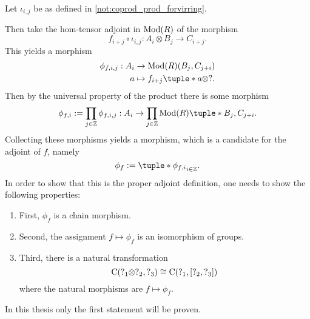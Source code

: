 \begin{remark}
\begin{center}
    \end{center}

    Let \( \iota_{i, j} \) be as defined in \autoref{not:coprod_prod_forvirring}.

    Then take the hom-tensor adjoint in \( \operatorname{Mod}(R) \) of the morphism
    \[
        f_{i + j} \circ \iota_{i, j}: A_i \otimes B_j \to C_{i + j}.
    \]
    This yields a morphism
    \begin{align*}
        \phi_{f, i, j}: A_i &\to \Mod(R)(B_j, C_{j + i}) \\
        a &\mapsto f_{i + j}\tuple*{ a \otimes ? }.
    \end{align*}
    Then by the universal property of the product there is some morphism
    \[
        \phi_{f, i} := \prod_{j \in \Zb} \phi_{f, i, j}: A_i \to \prod_{j \in \Zb} \Mod(R)\tuple*{B_j, C_{j + i}}.
    \]
    Collecting these morphisms yields a morphism, which is a candidate for the adjoint of \( f \), namely
    \[
        \phi_f := \tuple*{\phi_{f, i}}_{i \in \Zb}.
    \]
    In order to show that this is the proper adjoint definition, one needs to show the following properties:
    \begin{enumerate}
        \item {
            First, \( \phi_f \) is a chain morphism.
        }
        \item {
            Second, the assignment \( f \mapsto \phi_f \) is an isomorphism of groups.
        }
        \item {
            Third, there is a natural transformation
            \[
                \operatorname{C}(?_1 \otimes ?_2, ?_3) \cong \operatorname{C}(?_1, \left[ ?_2, ?_3 \right])
            \]
            where the natural morphisms are \( f \mapsto \phi_f \).
        }
    \end{enumerate}
    In this thesis only the first statement will be proven.


\end{remark}

